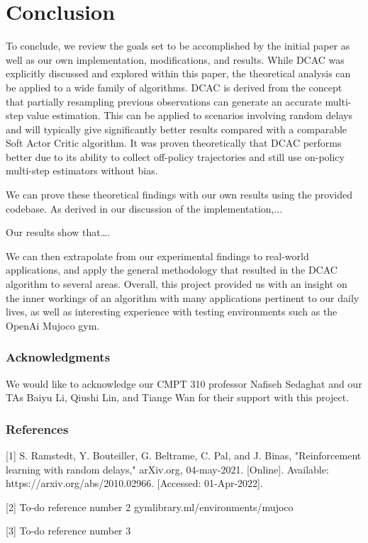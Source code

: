 \documentclass{article} %
\begin{document}
\section{Conclusion}

To conclude, we review the goals set to be accomplished by the initial paper as well as our own implementation, modifications, and results. While DCAC was explicitly discussed and explored within this paper, the theoretical analysis can be applied to a wide family of algorithms. DCAC is derived from the concept that partially resampling previous observations can generate an accurate multi-step value estimation. This can be applied to scenarios involving random delays and will typically give significantly better results compared with a comparable Soft Actor Critic algorithm. It was proven theoretically that DCAC performs better due to its ability to collect off-policy trajectories and still use on-policy multi-step estimators without bias. 

We can prove these theoretical findings with our own results using the provided codebase. As derived in our discussion of the implementation,... 

Our results show that….

We can then extrapolate from our experimental findings to real-world applications, and apply the general methodology that resulted in the DCAC algorithm to several areas. Overall, this project provided us with an insight on the inner workings of an algorithm with many applications pertinent to our daily lives, as well as interesting experience with testing environments such as the OpenAi Mujoco gym.



\subsubsection*{Acknowledgments}
We would like to acknowledge our CMPT 310 professor Nafiseh Sedaghat and our TAs 
Baiyu Li, Qiushi Lin, and Tiange Wan for their support with this project.

\subsubsection*{References}
\small{
[1] S. Ramstedt, Y. Bouteiller, G. Beltrame, C. Pal, and J. Binas, 
      "Reinforcement learning with random delays," arXiv.org, 04-may-2021. [Online]. 
      Available: https://arxiv.org/abs/2010.02966. [Accessed: 01-Apr-2022].

[2] To-do reference number 2 gymlibrary.ml/environments/mujoco

[3] To-do reference number 3
}
\end{document}
